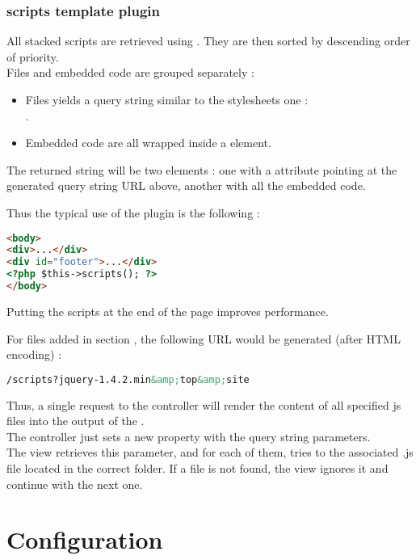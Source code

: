 \documentclass[pdftex,12pt,a4paper]{article}
\begin{document}
\subsubsection{scripts template plugin}
All stacked scripts are retrieved using . They are then sorted by descending order of priority.\\
Files and embedded code are grouped separately :
\begin{itemize}
	\item Files yields a query string similar to the stylesheets one :\\
.\\
	\item Embedded code are all wrapped inside a  element.
\end{itemize}
The returned string will be two  elements : one with a  attribute pointing at the generated query string URL above, another with all the embedded code.

Thus the typical use of the plugin is the following :
\begin{lstlisting}[language=HTML]
<body>
<div>...</div>
<div id="footer">...</div>
<?php $this->scripts(); ?>
</body>
\end{lstlisting}
Putting the scripts at the end of the page improves performance.

For files added in section , the following URL would be generated (after HTML encoding) :\\
\begin{lstlisting}[language=HTML]
/scripts?jquery-1.4.2.min&amp;top&amp;site
\end{lstlisting}

Thus, a single request to the  controller will render the content of all specified js files into the output of the .\\
The controller just sets a new  property with the query string parameters.\\
The view retrieves this parameter, and for each of them, tries to  the associated .js file located in the correct folder.
If a file is not found, the view ignores it and continue with the next one.

\clearpage

\appendix
\section{Configuration} \label{sec:configuration}
\end{document}
